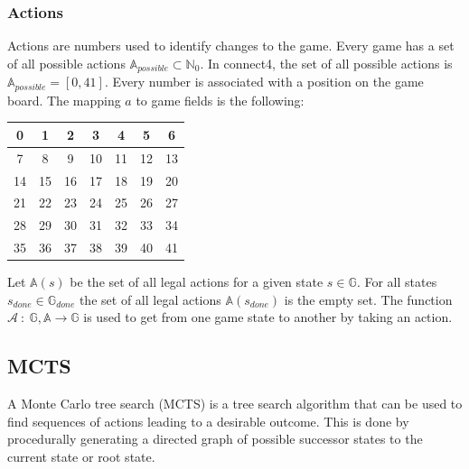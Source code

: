 \documentclass[12pt]{article}
\begin{document}
\subsubsection{Actions}
Actions are numbers used to identify changes to the game. Every game has a set of all possible actions \(\mathbb{A}_{possible} \subset \mathbb{N}_0\). In connect4, the set of all possible actions is \(\mathbb{A}_{possible} = [0, 41]\). Every number is associated with a position on the game board. The mapping \(a\) to game fields is the following:
\begin{center}
\begin{tabular}{| c | c | c | c | c | c | c |}
 \hline
0 & 1 & 2 & 3 & 4 & 5 & 6  \\\hline
7 & 8 & 9 & 10 & 11 & 12 & 13\\\hline
14 & 15 & 16 & 17 & 18 & 19 & 20 \\\hline
21 & 22 & 23& 24 & 25 & 26 & 27 \\\hline
28 & 29 & 30 & 31 & 32 & 33 & 34 \\\hline
35 & 36 & 37 & 38 & 39 & 40 & 41 \\\hline
\end{tabular}
\end{center}
Let \(\mathbb{A}(s)\) be the set of all legal actions for a given state  \(s \in \mathbb{G}\). For all states \(s_{done} \in \mathbb{G}_{done}\) the set of all legal actions \(\mathbb{A}(s_{done})\) is the empty set. The function \(\mathcal{A}~:~\mathbb{G}, \mathbb{A}\to\mathbb{G}\) is used to get from one game state to another by taking an action.

\subsection{MCTS}
A Monte Carlo tree search (MCTS) is a tree search algorithm that can be used to find sequences of actions leading to a desirable outcome. This is done by procedurally generating a directed graph of possible successor states to the current state or root state. 
\end{document}
